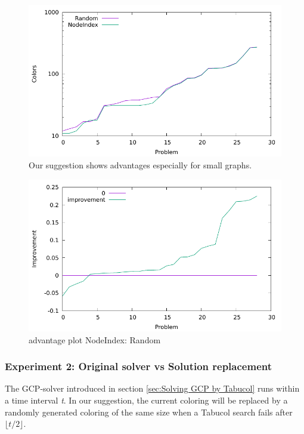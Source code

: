 \documentclass[12pt,a4paper,twoside]{scrartcl}
\numberwithin{equation}{section}
\begin{document}
 \begin{figure}[h!]
\centering
  \includegraphics[scale = 1]{Experiments/E1/caclog.pdf}
    \caption{Our suggestion shows advantages especially for small graphs.}
      \label{Experiment 1 cactus plot}
  \end{figure}
\begin{figure}[h!]
\centering
  \includegraphics[scale = 1]{Experiments/E1/impro.pdf}
      \caption{advantage plot NodeIndex: Random}
      \label{Experiment 1 advantage plot}
\end{figure}

\subsubsection{Experiment 2: Original solver vs Solution replacement}
\label{sec:Experiment 2} 
The GCP-solver introduced in section \ref{sec:Solving GCP by Tabucol} runs within a time interval \emph{t}. In our suggestion, the current coloring will be replaced by a randomly generated coloring of the same size when a Tabucol search fails after $\lfloor t/2 \rfloor$. 
\end{document}

